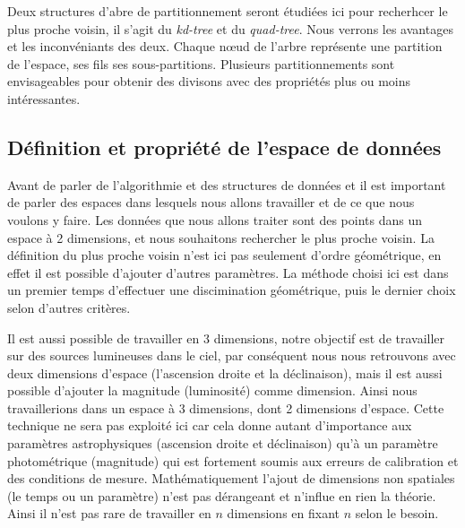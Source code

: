 Deux structures d'abre de partitionnement seront étudiées ici pour recherhcer le plus proche voisin, il s'agit du \emph{kd-tree} et du \emph{quad-tree}. Nous verrons les avantages et les inconvéniants des deux. Chaque n\oe{}ud de l'arbre représente une partition de l'espace, ses fils ses sous-partitions. Plusieurs partitionnements sont envisageables pour obtenir des divisons avec des propriétés plus ou moins intéressantes.


	\subsection{Définition et propriété de l'espace de données}

Avant de parler de l'algorithmie et des structures de données et il est important de parler des espaces dans lesquels nous allons travailler et de ce que nous voulons y faire. Les données que nous allons traiter sont des points dans un espace à 2 dimensions, et nous souhaitons rechercher le plus proche voisin. La définition du plus proche voisin n'est ici pas seulement d'ordre géométrique, en effet il est possible d'ajouter d'autres paramètres. La méthode choisi ici est dans un premier temps d'effectuer une discimination géométrique, puis le dernier choix selon d'autres critères.


Il est aussi possible de travailler en 3 dimensions, notre objectif est de travailler sur des sources lumineuses dans le ciel, par conséquent nous nous retrouvons avec deux dimensions d'espace (l'ascension droite et la déclinaison), mais il est aussi possible d'ajouter la magnitude (luminosité) comme dimension. Ainsi nous travaillerions dans un espace à 3 dimensions, dont 2 dimensions d'espace. Cette technique ne sera pas exploité ici car cela donne autant d'importance aux paramètres astrophysiques (ascension droite et déclinaison) qu'à un paramètre photométrique (magnitude) qui est fortement soumis aux erreurs de calibration et des conditions de mesure. Mathématiquement l'ajout de dimensions non spatiales (le temps ou un paramètre) n'est pas dérangeant et n'influe en rien la théorie. Ainsi il n'est pas rare de travailler en $n$ dimensions en fixant $n$ selon le besoin.

